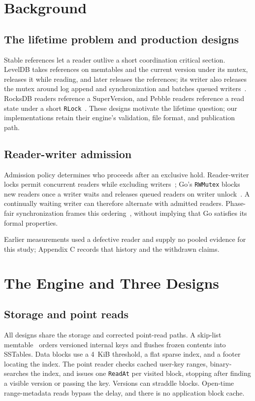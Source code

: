 \documentclass[conference]{IEEEtran}
\begin{document}
\section{Background}
\subsection{The lifetime problem and production designs}
Stable references let a reader outlive a short coordination critical section. LevelDB takes references on memtables and the current version under its mutex, releases it while reading, and later releases the references; its writer also releases the mutex around log append and synchronization and batches queued writers~\cite{leveldb}. RocksDB readers reference a SuperVersion, and Pebble readers reference a read state under a short \texttt{RLock}~\cite{rocksdb,pebble}. These designs motivate the lifetime question; our implementations retain their engine's validation, file format, and publication path.

\subsection{Reader-writer admission}
Admission policy determines who proceeds after an exclusive hold. Reader-writer locks permit concurrent readers while excluding writers~\cite{courtois1971}; Go's \texttt{RWMutex} blocks new readers once a writer waits and releases queued readers on writer unlock~\cite{goRWMutex}. A continually waiting writer can therefore alternate with admitted readers. Phase-fair synchronization frames this ordering~\cite{brandenburg2009}, without implying that Go satisfies its formal properties.

Earlier measurements used a defective reader and supply no pooled evidence for this study; Appendix C records that history and the withdrawn claims.

\section{The Engine and Three Designs}
\subsection{Storage and point reads}
All designs share the storage and corrected point-read paths. A skip-list memtable~\cite{pugh1990} orders versioned internal keys and flushes frozen contents into SSTables. Data blocks use a 4~KiB threshold, a flat sparse index, and a footer locating the index. The point reader checks cached user-key ranges, binary-searches the index, and issues one \texttt{ReadAt} per visited block, stopping after finding a visible version or passing the key. Versions can straddle blocks. Open-time range-metadata reads bypass the delay, and there is no application block cache.
\end{document}
